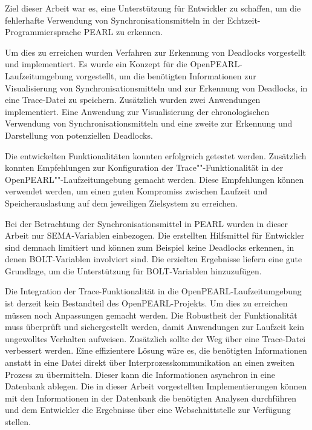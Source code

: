 Ziel dieser Arbeit war es, eine Unterstützung für Entwickler zu schaffen, um die
fehlerhafte Verwendung von Synchronisationsmitteln in der
Echtzeit-Programmiersprache PEARL zu erkennen.

Um dies zu erreichen wurden Verfahren zur Erkennung von Deadlocks vorgestellt
und implementiert. Es wurde ein Konzept für die OpenPEARL-Laufzeitumgebung
vorgestellt, um die benötigten Informationen zur Visualisierung von
Synchronisationsmitteln und zur Erkennung von Deadlocks, in eine Trace-Datei zu
speichern. Zusätzlich wurden zwei Anwendungen implementiert. Eine Anwendung zur
Visualisierung der chronologischen Verwendung von Synchronisationsmitteln und
eine zweite zur Erkennung und Darstellung von potenziellen Deadlocks.

Die entwickelten Funktionalitäten konnten erfolgreich getestet werden.
Zusätzlich konnten Empfehlungen zur Konfiguration der Trace""-Funktionalität in
der OpenPEARL""-Laufzeitumgebung gemacht werden. Diese Empfehlungen können
verwendet werden, um einen guten Kompromiss zwischen Laufzeit und
Speicherauslastung auf dem jeweiligen Zielsystem zu erreichen.

Bei der Betrachtung der Synchronisationsmittel in PEARL wurden in dieser Arbeit
nur \textrm{SEMA}-Variablen einbezogen. Die erstellten Hilfsmittel für
Entwickler sind demnach limitiert und können zum Beispiel keine Deadlocks
erkennen, in denen \textrm{BOLT}-Variablen involviert sind. Die erzielten
Ergebnisse liefern eine gute Grundlage, um die Unterstützung für
\textrm{BOLT}-Variablen hinzuzufügen.

Die Integration der Trace-Funktionalität in die OpenPEARL-Laufzeitumgebung ist
derzeit kein Bestandteil des OpenPEARL-Projekts. Um dies zu erreichen müssen
noch Anpassungen gemacht werden. Die Robustheit der Funktionalität muss
überprüft und sichergestellt werden, damit Anwendungen zur Laufzeit kein
ungewolltes Verhalten aufweisen. Zusätzlich sollte der Weg über eine Trace-Datei
verbessert werden. Eine effizientere Lösung wäre es, die benötigten
Informationen anstatt in eine Datei direkt über Interprozesskommunikation an
einen zweiten Prozess zu übermitteln. Dieser kann die Informationen asynchron in
eine Datenbank ablegen. Die in dieser Arbeit vorgestellten Implementierungen
können mit den Informationen in der Datenbank die benötigten Analysen
durchführen und dem Entwickler die Ergebnisse über eine Webschnittstelle zur
Verfügung stellen.